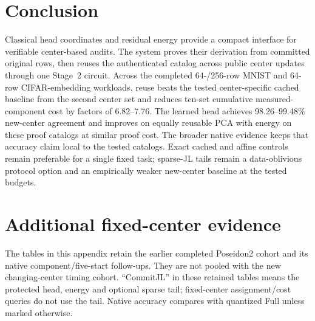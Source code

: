 \documentclass[5p,times,twocolumn]{elsarticle}
\theoremstyle{plain}
\theoremstyle{definition}
\theoremstyle{remark}
\begin{document}
\par\endgroup
\section{Conclusion}\label{sec:conclusion}
\begingroup\color{RevisionRed}
Classical head coordinates and residual energy provide a compact interface for verifiable center-based audits. The system proves their derivation from committed original rows, then reuses the authenticated catalog across public center updates through one Stage~2 circuit. Across the completed 64-/256-row MNIST and 64-row CIFAR-embedding workloads, reuse beats the tested center-specific cached baseline from the second center set and reduces ten-set cumulative measured-component cost by factors of 6.82--7.76. The learned head achieves 98.26--99.48\% new-center agreement and improves on equally reusable PCA with energy on these proof catalogs at similar proof cost. The broader native evidence keeps that accuracy claim local to the tested catalogs. Exact cached and affine controls remain preferable for a single fixed task; sparse-JL tails remain a data-oblivious protocol option and an empirically weaker new-center baseline at the tested budgets.


\par\endgroup


\FloatBarrier
\onecolumn
\appendix
{}
\renewcommand{\thetable}{\Alph{section}.\arabic{table}}
\renewcommand{\theHtable}{appendix.\Alph{section}.\arabic{table}}
\renewcommand{\theHequation}{appendix.\Alph{section}.\arabic{equation}}

\section{\textcolor{RevisionGreen}{Additional fixed-center evidence}}\label{app:fixed}
\begingroup\color{RevisionGreen}
The tables in this appendix retain the earlier completed Poseidon2 cohort and its native component/five-start follow-ups. They are not pooled with the new changing-center timing cohort. ``CommitJL'' in these retained tables means the protected head, energy and optional sparse tail; fixed-center assignment/cost queries do not use the tail. Native accuracy compares with quantized Full unless marked otherwise.
\end{document}
